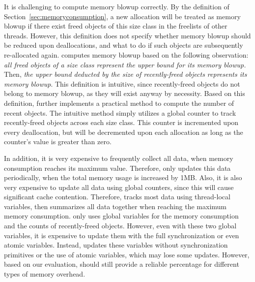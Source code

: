 It is challenging to compute memory blowup correctly. By the definition of Section~\ref{sec:memoryconsumption}, a new allocation will be treated as memory blowup if there exist freed objects of this size class in the freelists of other threads. However, this definition does not specify whether memory blowup should be reduced upon deallocations, and what to do if such objects are subsequently re-allocated again. \MP{} computes memory blowup based on the following observation: \textit{all freed objects of a size class represent the upper bound for its memory blowup.} Then, \textit{the upper bound deducted by the size of recently-freed objects represents its memory blowup}. This definition is intuitive, since recently-freed objects do not belong to memory blowup, as they will exist anyway by necessity. Based on this definition, \MP{} further implements a practical method to compute the number of recent objects. The intuitive method simply utilizes a global counter to track recently-freed objects across each size class. This counter is incremented upon every deallocation, but will be decremented upon each allocation as long as the counter's value is greater than zero.


In addition, it is very expensive to frequently collect all data, when memory consumption reaches its maximum value. Therefore, \MP{} only updates this data periodically, when the total memory usage is increased by 1MB. Also, it is also very expensive to update all data using global counters, since this will cause significant cache contention. Therefore, \MP{} tracks most data using thread-local variables, then summarizes all data together when reaching the maximum memory consumption. \MP{} only uses global variables for the memory consumption and the counts of recently-freed objects. However, even with these two global variables, it is expensive to update them with the full synchronization or even atomic variables. Instead, \MP{} updates these variables without synchronization primitives or the use of atomic variables, which may lose some updates. However, based on our evaluation, \MP{} should still provide a reliable percentage for different types of memory overhead.  




